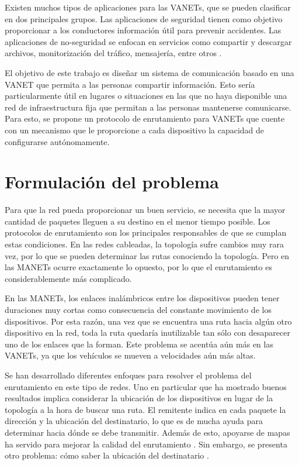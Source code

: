 Existen muchos tipos de aplicaciones para las VANETs, que se pueden clasificar
en dos principales grupos. Las aplicaciones de seguridad tienen como objetivo
proporcionar a los conductores información útil para prevenir accidentes. Las
aplicaciones de no-seguridad se enfocan en servicios como compartir y descargar
archivos, monitorización del tráfico, mensajería, entre otros
\cite{Meneguette2018}.

El objetivo de este trabajo es diseñar un sistema de comunicación basado en una
VANET que permita a las personas compartir información. Esto sería
particularmente útil en lugares o situaciones en las que no haya disponible una
red de infraestructura fija que permitan a las personas mantenerse comunicarse.
Para esto, se propone un protocolo de enrutamiento para VANETs que cuente con
un mecanismo que le proporcione a cada dispositivo la capacidad de configurarse
autónomamente.

\section{Formulación del problema}
\label{sec:formulacion_del_problema}

Para que la red pueda proporcionar un buen servicio, se necesita que la mayor
cantidad de paquetes lleguen a su destino en el menor tiempo posible. Los
protocolos de enrutamiento son los principales responsables de que se cumplan
estas condiciones. En las redes cableadas, la topología sufre cambios muy rara
vez, por lo que se pueden determinar las rutas conociendo la topología.
Pero en las MANETs ocurre exactamente lo opuesto, por lo que el enrutamiento es
considerablemente más complicado.

En las MANETs, los enlaces inalámbricos entre los dispositivos pueden tener
duraciones muy cortas como consecuencia del constante movimiento de los
dispositivos. Por esta razón, una vez que se encuentra una ruta hacia algún otro
dispositivo en la red, toda la ruta quedaría inutilizable tan sólo con
desaparecer uno de los enlaces que la forman. Este problema se acentúa aún más
en las VANETs, ya que los vehículos se mueven a velocidades aún más altas.

Se han desarrollado diferentes enfoques para resolver el problema del
enrutamiento en este tipo de redes. Uno en particular que ha mostrado buenos
resultados implica considerar la ubicación de los dispositivos en lugar de la
topología a la hora de buscar una ruta. El remitente indica en cada paquete la
dirección y la ubicación del destinatario, lo que es de mucha ayuda para
determinar hacia dónde se debe transmitir. Además de esto, apoyarse de mapas ha
servido para mejorar la calidad del enrutamiento \cite{Lochert2003}. Sin
embargo, se presenta otro problema: cómo saber la ubicación del destinatario
\cite{Brendha2017}.

